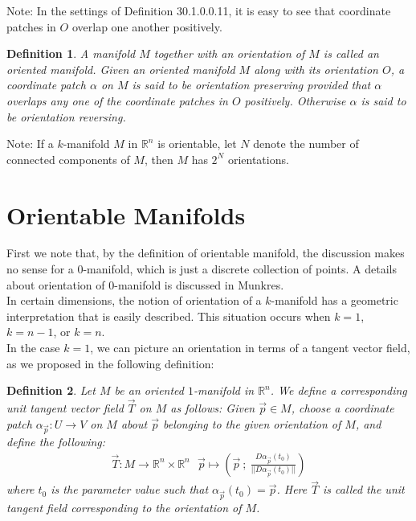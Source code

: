 \documentclass[15pt]{book}
\theoremstyle{break}
\theoremstyle{break}
\newtheorem{defn}{Definition}[corL]
\newcommand{\R}{\mathbb{R}}
\newcommand{\note}{\color{red}Note: \color{black}}
\begin{document}
\note In the settings of Definition 30.1.0.0.11, it is easy to see that coordinate patches in $O$ overlap one another positively.

\begin{defn}
A manifold $M$ together with an orientation of $M$ is called an oriented manifold. Given an oriented manifold $M$ along with its orientation $O$, a coordinate patch $\alpha$ on $M$ is said to be orientation preserving provided that $\alpha$ overlaps any one of the coordinate patches in $O$ positively. Otherwise $\alpha$ is said to be orientation reversing. 
\end{defn}

\note If a $k$-manifold $M$ in $\R^n$ is orientable, let $N$ denote the number of connected components of $M$, then $M$ has $2^{N}$ orientations. \\


\newpage
\section[Orientable Manifolds]{\color{red}Orientable Manifolds \color{black}}

First we note that, by the definition of orientable manifold, the discussion makes no sense for a $0$-manifold, which is just a discrete collection of points. A details about orientation of $0$-manifold is discussed in Munkres.\\

In certain dimensions, the notion of orientation of a $k$-manifold has a geometric interpretation that is easily described. This situation occurs when $k = 1$, $k=n-1$, or $k=n$.\\

In the case $k=1$, we can picture an orientation in terms of a tangent vector field, as we proposed in the following definition:
\begin{defn}
Let $M$ be an oriented $1$-manifold in $\R^n$. We define a corresponding unit tangent vector field $\vec{T}$ on $M$ as follows: Given $\vec{p} \in M$, choose a coordinate patch $\alpha_{\vec{p}} :U \to V$ on $M$ about $\vec{p}$ belonging to the given orientation of $M$, and define the following:
\begin{align*}
\vec{T}:M \to \R^n\times \R^n \ \ \ \vec{p}\mapsto \left(\vec{p}\ ;\ \frac{D\alpha_{\vec{p}}(t_0)}{||D\alpha_{\vec{p}}(t_0)||}\right)
\end{align*}
where $t_0$ is the parameter value such that $\alpha_{\vec{p}}(t_0 ) = \vec{p}$. Here $\vec{T}$ is called the unit tangent field corresponding to the orientation of $M$.
\end{defn}
\end{document}
